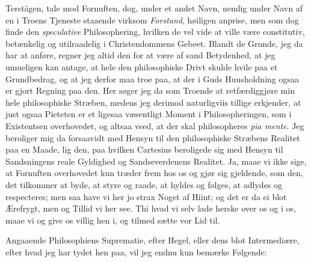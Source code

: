 \documentclass[12pt,a4paper]{book}
\newcommand{\apage}[1]{\marginnote{\footnotesize\textit{[#1]}}}
\begin{document}
Terstägen, tale mod Fornuften, dog, under et andet Navn, nemlig under Navn af
en i Troens Tjeneste staaende virksom \emph{Forstand}, høiligen anprise, men som dog
finde den \emph{speculative} Philosophering, hvilken de vel vide at ville være
constitutiv, betænkelig og utilraadelig i Christendommens Gebeet. Blandt de
Grunde, jeg da har at anføre, regner jeg altid den for at være af sand
Betydenhed, at jeg umueligen kan antage, at hele den philosophiske Drivt skulde
hvile paa et Grundbedrag, og at jeg derfor maa troe paa, at der i Guds
Huusholdning ogsaa er gjort Regning paa den. Her søger jeg da som Troende at
retfærdiggjøre min hele philosophiske Stræben, medens jeg derimod
naturligviis tillige erkjender, at just ogsaa Pieteten er et ligesaa
væsentligt Moment i Philosopheringen, som i Existentsen overhovedet, og altsaa
veed, at der skal philosopheres \textit{pia mente}. Jeg beroliger mig da
forsaavidt med Hensyn til den philosophiske Stræbens Realitet paa en Maade, lig
den, paa hvilken Cartesius beroligede sig med Hensyn til Sandsningens reale
Gyldighed og Sandseverdenens Realitet. Ja, maae vi ikke sige, at Fornuften
overhovedet kun træder frem hos os og gjør sig gjeldende, som den, det
tilkommer at byde, at styre og raade, at hyldes og følges, at adlydes og
respecteres; men saa have vi her jo strax Noget af Hiint; og det er da ei blot
Ærefrygt, men og Tillid vi her see. Thi hvad vi selv lade herske over os og i
os, maae vi og give os villig hen i, og tilmed sætte vor Lid til.

\apage{116} %
Angaaende Philosophiens Suprematie, efter Hegel, eller dens blot
Intermediære, efter hvad jeg har tydet hen paa, vil jeg endnu kun bemærke
Følgende:
\end{document}
